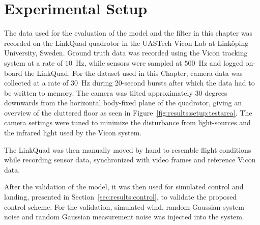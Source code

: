 \section{Experimental Setup}
\label{sec:results:setup}
    The data used for the evaluation of the model and the filter in
    this chapter was recorded on the LinkQuad quadrotor in the UASTech Vicon Lab
    at Linköping University, Sweden. Ground truth data was recorded using
    the Vicon tracking system at a rate of $10$~Hz, while sensors were sampled
    at $500$~Hz and logged on-board the LinkQuad.
    For the dataset used in this Chapter,
    camera data was collected at a rate of $30$~Hz during 20-second bursts after
    which the data had to be written to memory.
    The camera was tilted approximately $30$ degrees downwards from the
    horizontal body-fixed plane of the quadrotor, giving an overview of the cluttered
    floor as seen in Figure~\ref{fig:results:setup:testarea}.
    The camera settings were tuned to minimize the disturbance from light-sources
    and the infrared light used by the Vicon system.

    The LinkQuad was then manually moved by hand to resemble flight conditions
    while recording sensor data, synchronized with video frames and reference Vicon data.


    After the validation of the model, it was then used for simulated
    control and landing, presented in Section~\ref{sec:results:control},
    to validate the proposed control scheme.
    For the validation, simulated wind, random Gaussian system noise and
    random Gaussian measurement noise was injected into the system.
